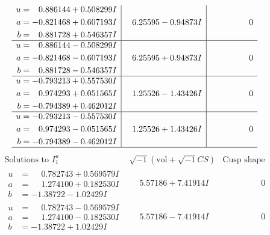 \documentclass[1p]{elsarticle_modified}
\theoremstyle{definition}
\newcommand{\I}{\sqrt{-1}}
\begin{document}
$$\begin{array}{c|c|c}
\begin{aligned}
u &= \phantom{-}0.886144 + 0.508299 I \\
a &= -0.821468 + 0.607193 I \\
b &= \phantom{-}0.881728 + 0.546357 I\end{aligned}
 & \phantom{-}6.25595 - 0.94873 I & \phantom{-0.000000 } 0 \\ \hline\begin{aligned}
u &= \phantom{-}0.886144 - 0.508299 I \\
a &= -0.821468 - 0.607193 I \\
b &= \phantom{-}0.881728 - 0.546357 I\end{aligned}
 & \phantom{-}6.25595 + 0.94873 I & \phantom{-0.000000 } 0 \\ \hline\begin{aligned}
u &= -0.793213 + 0.557530 I \\
a &= \phantom{-}0.974293 + 0.051565 I \\
b &= -0.794389 + 0.462012 I\end{aligned}
 & \phantom{-}1.25526 - 1.43426 I & \phantom{-0.000000 } 0 \\ \hline\begin{aligned}
u &= -0.793213 - 0.557530 I \\
a &= \phantom{-}0.974293 - 0.051565 I \\
b &= -0.794389 - 0.462012 I\end{aligned}
 & \phantom{-}1.25526 + 1.43426 I & \phantom{-0.000000 } 0\\
 \hline 
 \end{array}$$\newpage$$\begin{array}{c|c|c}  
\text{Solutions to }I^u_{1}& \I (\text{vol} + \sqrt{-1}CS) & \text{Cusp shape}\\
 \hline 
\begin{aligned}
u &= \phantom{-}0.782743 + 0.569579 I \\
a &= \phantom{-}1.274100 + 0.182530 I \\
b &= -1.38722 - 1.02429 I\end{aligned}
 & \phantom{-}5.57186 + 7.41914 I & \phantom{-0.000000 } 0 \\ \hline\begin{aligned}
u &= \phantom{-}0.782743 - 0.569579 I \\
a &= \phantom{-}1.274100 - 0.182530 I \\
b &= -1.38722 + 1.02429 I\end{aligned}
 & \phantom{-}5.57186 - 7.41914 I & \phantom{-0.000000 } 0 \\ \hline\begin{aligned}

\end{aligned}
\end{array}$$
\end{document}
